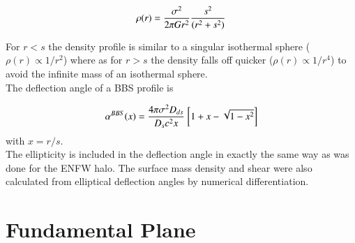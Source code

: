\documentclass[useAMS,usenatbib]{mn2e}
\newcounter{one}   \setcounter{one}{1}
\begin{document}
\begin{equation}
  \rho(r)={\sigma^2 \over 2\pi G r^2}{s^2 \over (r^2+s^2)}
\end{equation}

For $r<s$ the density profile is similar to a singular isothermal
sphere ($\rho(r)\propto 1/r^2$) where as for $r>s$ the density falls
off quicker ($\rho(r)\propto 1/r^4$) to avoid the infinite mass of an
isothermal sphere.\\

The deflection angle of a BBS profile is

\begin{equation}
  \alpha^{BBS}(x)={4 \pi \sigma^2 D_{ds} \over D_{s} c^2 x}\
  \bigg[1+x-\sqrt{1-x^2}\bigg]
\end{equation}
with $x=r/s$.\\

The ellipticity is included in the deflection angle in exactly the
same way as was done for the ENFW halo. The surface mass density and
shear were also calculated from elliptical deflection angles by
numerical differentiation.\\

\clearpage

\section{Fundamental Plane}
\label{app:FP}
  
\end{document}
